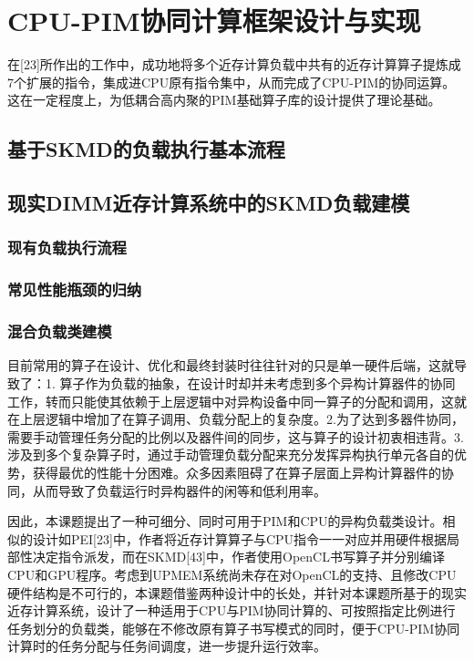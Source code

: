 \chapter{CPU-PIM协同计算框架设计与实现}\label{chap:Task_Mapping_And_Modeling_Method} 
    在[23]所作出的工作中，成功地将多个近存计算负载中共有的近存计算算子提炼成7个扩展的指令，集成进CPU原有指令集中，从而完成了CPU-PIM的协同运算。这在一定程度上，为低耦合高内聚的PIM基础算子库的设计提供了理论基础。
\section{基于SKMD的负载执行基本流程}\label{sec:SKMD_based_task_execution_procedure}


\section{现实DIMM近存计算系统中的SKMD负载建模}\label{sec:DIMM-PNM_sys_SKMD_task_modeling}
  \subsection{现有负载执行流程}\label{subsec:DIMM-PNM_sys_task_execution_procedure}
  \subsection{常见性能瓶颈的归纳}\label{sec:normal_bound_of_UPMEM}
  \subsection{混合负载类建模}\label{subsubsec:load_abstraction}
  目前常用的算子在设计、优化和最终封装时往往针对的只是单一硬件后端，这就导致了：1. 算子作为负载的抽象，在设计时却并未考虑到多个异构计算器件的协同工作，转而只能使其依赖于上层逻辑中对异构设备中同一算子的分配和调用，这就在上层逻辑中增加了在算子调用、负载分配上的复杂度。2.为了达到多器件协同，需要手动管理任务分配的比例以及器件间的同步，这与算子的设计初衷相违背。3. 涉及到多个复杂算子时，通过手动管理负载分配来充分发挥异构执行单元各自的优势，获得最优的性能十分困难。众多因素阻碍了在算子层面上异构计算器件的协同，从而导致了负载运行时异构器件的闲等和低利用率。
    
    因此，本课题提出了一种可细分、同时可用于PIM和CPU的异构负载类设计。相似的设计如PEI[23]中，作者将近存计算算子与CPU指令一一对应并用硬件根据局部性决定指令派发，而在SKMD[43]中，作者使用OpenCL书写算子并分别编译CPU和GPU程序。考虑到UPMEM系统尚未存在对OpenCL的支持、且修改CPU硬件结构是不可行的，本课题借鉴两种设计中的长处，并针对本课题所基于的现实近存计算系统，设计了一种适用于CPU与PIM协同计算的、可按照指定比例进行任务划分的负载类，能够在不修改原有算子书写模式的同时，便于CPU-PIM协同计算时的任务分配与任务间调度，进一步提升运行效率。

